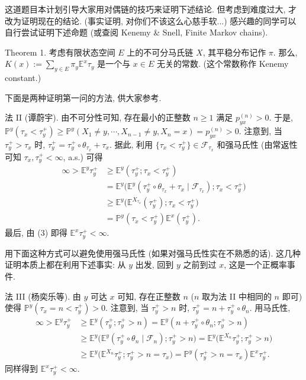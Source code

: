 \begin{enumerate}
\begin{proofc}[证明]
        这道题目本计划引导大家用对偶链的技巧来证明下述结论. 但考虑到难度过大, 才改为证明现在的结论. (事实证明, 对你们不该这么心慈手软...) 感兴趣的同学可以自行尝试证明下述命题 (或查阅 Kenemy \& Snell, Finite Markov chains). 
        
        Theorem 1. 考虑有限状态空间 $E$ 上的不可分马氏链 $X$, 其平稳分布记作 $\pi$. 那么, $K(x):=\sum_{y\in E}\pi_y\mathbb E^x\tau_y$ 是一个与 $x\in E$ 无关的常数. (这个常数称作 Kenemy constant.) 
        
        下面是两种证明第一问的方法, 供大家参考. 
        
        法 II (谭蔚宇). 由不可分性可知, 存在最小的正整数 $n\geq 1$ 满足 $p_{yx}^{(n)}>0$. 于是, $\mathbb P^y(\tau_x<\tau_y^+)\geq \mathbb P^y(X_1\neq y,\cdots,X_{n-1}\neq y,X_n=x)=p_{yx}^{(n)}>0$.
        注意到, 当 $\tau_y^+>\tau_x$ 时, $\tau_y^+=\tau_y^+\circ\theta_{\tau_x}+\tau_x$. 据此, 利用 $\{\tau_x<\tau_y^+\}\in\mathscr F_{\tau_x}$ 和强马氏性 (由常返性可知 $\tau_x,\tau_y^+<\infty$, a.s.) 可得 
        \[ \begin{aligned} \infty>\mathbb E^y\tau_y^+ &\geq \mathbb E^y(\tau_y^+;\tau_x<\tau_y^+)\\ &=\mathbb E^y\bigl(\mathbb E^y(\tau_y^+\circ\theta_{\tau_x}+\tau_x\mid\mathscr F_{\tau_x});\tau_x<\tau_y^+\bigr)\\ &\geq \mathbb E^y\bigl(\mathbb E^{X_{\tau_x}}(\tau_y^+);\tau_x<\tau_y^+\bigr)\\ &=\mathbb P^y(\tau_x<\tau_y^+)\mathbb E^x(\tau_y^+). \end{aligned} \] 
        最后, 由 (3) 即得 $\mathbb E^x\tau_y^+<\infty$. 
        
        用下面这种方式可以避免使用强马氏性 (如果对强马氏性实在不熟悉的话). 这几种证明本质上都在利用下述事实: 从 $y$ 出发, 回到 $y$ 之前到过 $x$, 这是一个正概率事件. 
        
        法 III (杨奕乐等). 由 $y$ 可达 $x$ 可知, 存在正整数 $n$ ($n$ 取为法 II 中相同的 $n$ 即可) 使得 $\mathbb P^y(\tau_x=n<\tau_y^+)>0$. 注意到, 当 $\tau_y^+>n$ 时, $\tau_y^+=n+\tau_y^+\circ\theta_n$. 用马氏性, \[ \begin{aligned} \infty>\mathbb E^y\tau_y^+ &\geq \mathbb E^y(\tau_y^+;\tau_y^+>n) =\mathbb E^y(n+\tau_y^+\circ\theta_n;\tau_y^+>n)\\ &\geq \mathbb E^y\bigl(\mathbb E^y(\tau_y^+\circ\theta_n\mid\mathscr F_n);\tau_y^+>n\bigr) =\mathbb E^y\bigl(\mathbb E^{X_n}\tau_y^+;\tau_y^+>n\bigr)\\ &\geq \mathbb E^y\bigl(\mathbb E^{X_n}\tau_y^+;\tau_y^+>n=\tau_x\bigr) =\mathbb P^y(\tau_y^+>n=\tau_x)\mathbb E^x\tau_y^+. \end{aligned} \] 同样得到 $\mathbb E^x\tau_y^+<\infty$. 
        

\end{proofc}
\end{enumerate}

